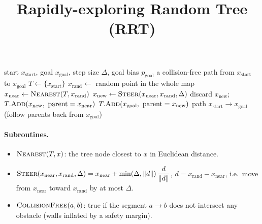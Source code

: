 \documentclass[11pt]{article}
\title{Rapidly-exploring Random Tree (RRT)}
\date{}
\begin{document}
\maketitle

\begin{algorithm}[h]
\caption{RRT}
\label{alg:rrt}
\begin{algorithmic}[1]
\Require start $x_{\text{start}}$, goal $x_{\text{goal}}$, step size $\Delta$, goal bias $p_{\text{goal}}$
\Ensure a collision-free path from $x_{\text{start}}$ to $x_{\text{goal}}$
\State $T \gets \{x_{\text{start}}\}$
\Repeat
  \State $x_{\text{rand}} \gets$ random point in the whole map
  \State $x_{\text{near}} \gets \Call{Nearest}{T, x_{\text{rand}}}$
  \State $x_{\text{new}} \gets \Call{Steer}{x_{\text{near}}, x_{\text{rand}}, \Delta}$
    \State discard $x_{\text{new}}$; \Continue
  \EndIf
  \State $T.\Call{Add}{x_{\text{new}},\ \text{parent} = x_{\text{near}}}$
    \State $T.\Call{Add}{x_{\text{goal}},\ \text{parent} = x_{\text{new}}}$
    \State \Return path $x_{\text{start}} \to x_{\text{goal}}$ (follow parents back from $x_{\text{goal}}$)
  \EndIf
{}
\end{algorithmic}
\end{algorithm}

\paragraph{Subroutines.}
\begin{itemize}
  \item $\Call{Nearest}{T, x}$: the tree node closest to $x$ in Euclidean distance.
  \item $\Call{Steer}{x_{\text{near}}, x_{\text{rand}}, \Delta}
        = x_{\text{near}} + \min\!\left(\Delta, \lVert d \rVert\right) \dfrac{d}{\lVert d \rVert}$,
        \quad $d = x_{\text{rand}} - x_{\text{near}}$,
        i.e.\ move from $x_{\text{near}}$ toward $x_{\text{rand}}$ by at most $\Delta$.
  \item $\Call{CollisionFree}{a, b}$: true if the segment $a \to b$ does not intersect any
        obstacle (walls inflated by a safety margin).
\end{itemize}
\end{document}
